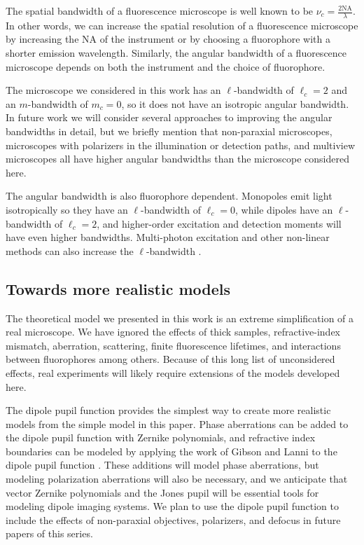 \documentclass[]{osa-article}
\begin{document}
The spatial bandwidth of a fluorescence microscope is well known to be
$\nu_c = \frac{2\text{NA}}{\lambda}$. In other words, we can increase the
spatial resolution of a fluorescence microscope by increasing the NA of the
instrument or by choosing a fluorophore with a shorter emission wavelength.
Similarly, the angular bandwidth of a fluorescence microscope depends on both
the instrument and the choice of fluorophore.

The microscope we considered in this work has an $\ell$-bandwidth of
$\ell_c = 2$ and an $m$-bandwidth of $m_c = 0$, so it does not have an isotropic
angular bandwidth. In future work we will consider several approaches to
improving the angular bandwidths in detail, but we briefly mention that
non-paraxial microscopes, microscopes with polarizers in the illumination or
detection paths, and multiview microscopes all have higher angular bandwidths
than the microscope considered here.

The angular bandwidth is also fluorophore dependent. Monopoles emit light
isotropically so they have an $\ell$-bandwidth of $\ell_c = 0$, while dipoles
have an $\ell$-bandwidth of $\ell_c = 2$, and higher-order excitation and
detection moments will have even higher bandwidths. Multi-photon excitation and
other non-linear methods can also increase the $\ell$-bandwidth
\cite{brasselet2011}.

\subsection{Towards more realistic models}
The theoretical model we presented in this work is an extreme simplification of
a real microscope. We have ignored the effects of thick samples,
refractive-index mismatch, aberration, scattering, finite fluorescence
lifetimes, and interactions between fluorophores among others. Because of this
long list of unconsidered effects, real experiments will likely require
extensions of the models developed here.

The dipole pupil function provides the simplest way to create more realistic
models from the simple model in this paper. Phase aberrations can be added to
the dipole pupil function with Zernike polynomials, and refractive index
boundaries can be modeled by applying the work of Gibson and Lanni to the dipole
pupil function \cite{gibson89}. These additions will model phase aberrations,
but modeling polarization aberrations will also be necessary, and we anticipate
that vector Zernike polynomials and the Jones pupil \cite{zhao2007, xu2015,
  chipman1989} will be essential tools for modeling dipole imaging systems. We
plan to use the dipole pupil function to include the effects of non-paraxial
objectives, polarizers, and defocus in future papers of this series.
\end{document}
